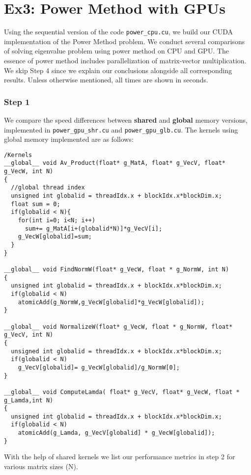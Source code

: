 \section{Ex3: Power Method with GPUs}
\label{sec:gpu}
Using the sequential version of the code \texttt{power\_cpu.cu}, we build our CUDA implementation \nocite{slides} \nocite{kirk2016parallel} of the Power Method problem. We conduct several comparisons of solving eigenvalue problem using power method on CPU and GPU. The essence of power method includes parallelization of matrix-vector multiplication. We skip Step 4 since we explain our conclusions alongside all corresponding results. Unless otherwise mentioned, all times are shown in seconds.

\subsubsection*{Step 1}
We compare the speed differences between \textbf{shared} and \textbf{global} memory versions, implemented in \texttt{power\_gpu\_shr.cu} and \texttt{power\_gpu\_glb.cu}. The kernels using global memory implemented are as follows:

\begin{lstlisting}[style=CStyle]
/Kernels
__global__ void Av_Product(float* g_MatA, float* g_VecV, float* g_VecW, int N)
{
  //global thread index
  unsigned int globalid = threadIdx.x + blockIdx.x*blockDim.x;
  float sum = 0;
  if(globalid < N){
    for(int i=0; i<N; i++)
      sum+= g_MatA[i+(globalid*N)]*g_VecV[i];
    g_VecW[globalid]=sum;        
  }
}

__global__ void FindNormW(float* g_VecW, float * g_NormW, int N)
{
  unsigned int globalid = threadIdx.x + blockIdx.x*blockDim.x;
  if(globalid < N)
    atomicAdd(g_NormW,g_VecW[globalid]*g_VecW[globalid]);
}

__global__ void NormalizeW(float* g_VecW, float * g_NormW, float* g_VecV, int N)
{
  unsigned int globalid = threadIdx.x + blockIdx.x*blockDim.x;
  if(globalid < N)
    g_VecV[globalid]= g_VecW[globalid]/g_NormW[0];
}

__global__ void ComputeLamda( float* g_VecV, float* g_VecW, float * g_Lamda,int N)
{
  unsigned int globalid = threadIdx.x + blockIdx.x*blockDim.x;
  if(globalid < N)
    atomicAdd(g_Lamda, g_VecV[globalid] * g_VecW[globalid]);
}
\end{lstlisting}

With the help of shared kernels we list our performance metrics in step 2 for various matrix sizes (N).

